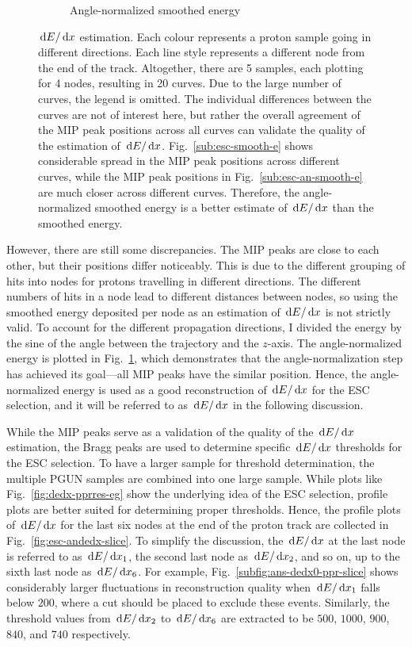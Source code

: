 \begin{figure}[h]
\begin{subfigure}{\dbfigwid\textwidth}
             \caption{Angle-normalized smoothed energy}
             \label{subfig:esc-an-smooth-e}
        \end{subfigure}
        \caption{$\,\textrm{d}E/\,\textrm{d}x$ estimation. Each colour represents a proton sample going in different directions. Each line style represents a different node from the end of the track. Altogether, there are 5 samples, each plotting for 4 nodes, resulting in 20 curves. Due to the large number of curves, the legend is omitted. The individual differences between the curves are not of interest here, but rather the overall agreement of the MIP peak positions across all curves can validate the quality of the estimation of $\,\textrm{d}E/\,\textrm{d}x$. Fig.~\ref{sub:esc-smooth-e} shows considerable spread in the MIP peak positions across different curves, while the MIP peak positions in Fig.~\ref{sub:esc-an-smooth-e} are much closer across different curves. Therefore, the angle-normalized smoothed energy is a better estimate of $\,\textrm{d}E/\,\textrm{d}x$ than the smoothed energy.}
        \label{fig:esc-angnorm}
     \end{figure}
     However, there are still some discrepancies.
     The MIP peaks are close to each other, but their positions differ noticeably.
     This is due to the different grouping of hits into nodes for protons travelling in different directions.
     The different numbers of hits in a node lead to different distances between nodes, so using the smoothed energy deposited per node as an estimation of $\,\textrm{d}E/\,\textrm{d}x$ is not strictly valid.
     To account for the different propagation directions, I divided the energy by the sine of the angle between the trajectory and the $z$-axis.
     The angle-normalized energy is plotted in Fig.~\ref{subfig:esc-an-smooth-e}, which demonstrates that the angle-normalization step has achieved its goal—all MIP peaks have the similar position.
     Hence, the angle-normalized energy is used as a good reconstruction of $\,\textrm{d}E/\,\textrm{d}x$ for the ESC selection, and it will be referred to as $\,\textrm{d}E/\,\textrm{d}x$ in the following discussion.

     While the MIP peaks serve as a validation of the quality of the $\,\textrm{d}E/\,\textrm{d}x$ estimation, the Bragg peaks are used to determine specific $\,\textrm{d}E/\,\textrm{d}x$ thresholds for the ESC selection.
     To have a larger sample for threshold determination, the multiple PGUN samples are combined into one large sample.
     While plots like Fig.~\ref{fig:dedx-pprres-eg} show the underlying idea of the ESC selection, profile plots are better suited for determining proper thresholds.
     Hence, the profile plots of $\,\textrm{d}E/\,\textrm{d}x$ for the last six nodes at the end of the proton track are collected in Fig.~\ref{fig:esc-andedx-slice}.
     To simplify the discussion, the $\,\textrm{d}E/\,\textrm{d}x$ at the last node is referred to as $\,\textrm{d}E/\,\textrm{d}x_1$, the second last node as $\,\textrm{d}E/\,\textrm{d}x_2$, and so on, up to the sixth last node as $\,\textrm{d}E/\,\textrm{d}x_6$.
     For example, Fig.~\ref{subfig:ans-dedx0-ppr-slice} shows considerably larger fluctuations in reconstruction quality when $\,\textrm{d}E/\,\textrm{d}x_1$ falls below $200$, where a cut should be placed to exclude these events.
     Similarly, the threshold values from $\,\textrm{d}E/\,\textrm{d}x_2$ to $\,\textrm{d}E/\,\textrm{d}x_6$ are extracted to be $500$, $1000$, $900$, $840$, and $740$ respectively.

